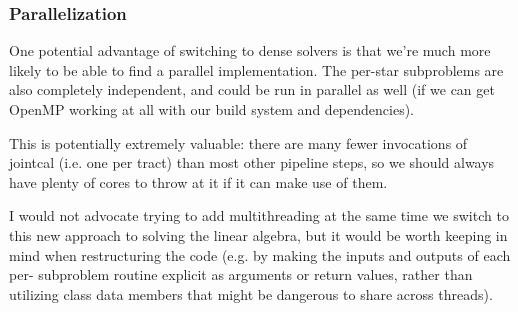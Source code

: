 \subsubsection{Parallelization}

One potential advantage of switching to dense solvers is that we're much more likely to be able to find a parallel implementation.
The per-star subproblems are also completely independent, and could be run in parallel as well (if we can get OpenMP working at all with our build system and dependencies).

This is potentially extremely valuable: there are many fewer invocations of jointcal (i.e. one per tract) than most other pipeline steps, so we should always have plenty of cores to throw at it if it can make use of them.

I would not advocate trying to add multithreading at the same time we switch to this new approach to solving the linear algebra, but it would be worth keeping in mind when restructuring the code (e.g. by making the inputs and outputs of each per- subproblem routine explicit as arguments or return values, rather than utilizing class data members that might be dangerous to share across threads).
